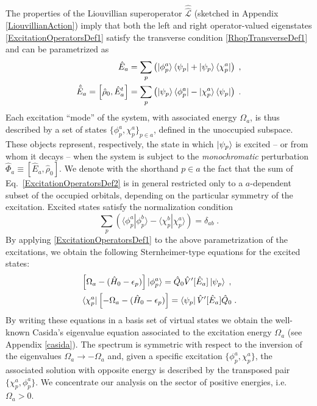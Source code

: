 \documentclass[reprint,aps,prb]{revtex4-1}
\newcommand{\eps}{\epsilon}
\newcommand{\be}{\begin{equation}}
\newcommand{\ee}{\end{equation}}
\newcommand{\nn}{\notag}
\newcommand{\lb}{\label}
\newcommand{\op}[1]{\hat {#1}}
\newcommand{\sop}[1]{\op{\op {#1}}}
\newcommand{\commutator}[2]{\left[ {#1} , {#2} \right]}
\newcommand{\brket}[2]{\langle  #1 | #2 \rangle} %
\newcommand{\dmnot}{\op{\rho}_0}
\newcommand{\hnot}{\op{H}_0}
\newcommand{\Liouv}{\sop{\mathcal L}}
\begin{document}
The properties of the Liouvillian superoperator $\Liouv$ (sketched in Appendix \ref{LiouvillianAction}) imply that both the left and right operator-valued
eigenstates \eqref{ExcitationOperatorsDef1} satisfy the transverse condition \eqref{RhopTransverseDef1} and can be parametrized as
\begin{align}\lb{ExcitationOperatorsDef2}
\op E_a &= \sum_p \left( \ket{\phi^a_p}\bra{\psi_p} + \ket{\psi_p} \bra{\chi^a_p}\right)\;, \nn \\
\op{\tilde E}_a = \commutator{\dmnot}{\op E^t_a} &= \sum_p \left( \ket{\psi_p}\bra{\phi^a_p} - \ket{\chi^a_p} \bra{\psi_p}\right)\;.
\end{align}
Each excitation ``mode'' of the system, with associated energy $\Omega_a$, is thus described by a set of states $\{\phi^a_p,\chi^a_p\}_{p \in a}$, defined in the unoccupied subspace. These objects represent, respectively, the state in which $\ket{\psi_p}$ is excited -- or from whom it decays -- when the system is subject to the \emph{monochromatic} perturbation $\op \Phi_a \equiv \commutator{\op E_a}{\dmnot}$. We denote with the shorthand $p \in a$ the fact that the sum of Eq.~\eqref{ExcitationOperatorsDef2} is in general restricted only to a $a$-dependent subset of the occupied orbitals, depending on the particular symmetry
of the excitation. Excited states  satisfy the normalization condition
\be\lb{ExcitedStateOrthNormDef1}
\sum_p \left(\brket{\phi_p^a}{\phi_p^b} - \brket{\chi_p^b}{\chi_p^a}\right) = \delta_{ab} \;.
\ee
By applying \eqref{ExcitationOperatorsDef1} to the above parametrization
of the excitations, we obtain the following Sternheimer-type equations for the excited states:
\begin{align}\lb{ExcitationOperatorsDef3}
&\left[\Omega_a-(\hnot - \eps_p)\right] \ket{\phi_p^a} = \op Q_0 \op V'[\op E_a] \ket{\psi_p} \;, \nn\\
&\bra{\chi_p^a}\left[-\Omega_a-(\hnot - \eps_p)\right] = \bra{\psi_p} \op V'[\op E_a] \op Q_0  \;.
\end{align}
By writing these equations in a basis set of virtual states we obtain the well-known Casida's eigenvalue equation\cite{casida1995}
associated to the excitation energy $\Omega_a$ (see Appendix \ref{casida}).
The spectrum is symmetric with respect to the inversion of the eigenvalues $\Omega_a \rightarrow -\Omega_a$ and, given a specific excitation $\{\phi^a_p,\chi^a_p\}$,
the associated solution with opposite energy is described by the transposed pair $\{\chi^a_p,\phi^a_p\}$.
We concentrate our analysis on the sector of positive energies, i.e. $\Omega_a > 0$.
\end{document}
